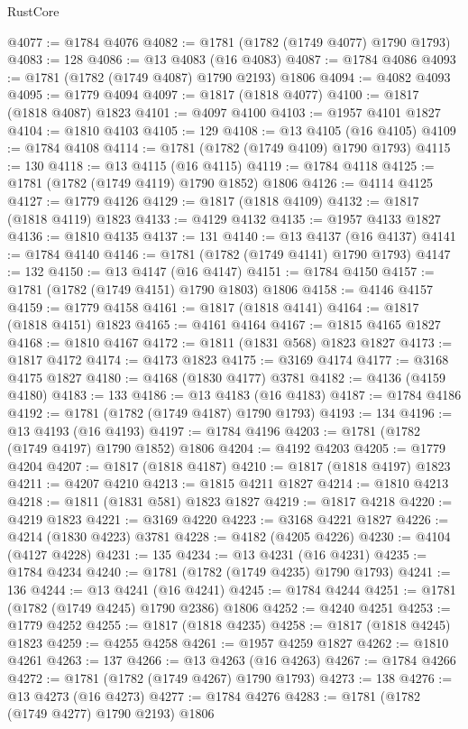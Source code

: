 \begin{lexlean}{RustCore}
\begin{coremodule}
@4077 := @1784 @4076
@4082 := @1781 (@1782 (@1749 @4077) @1790 @1793)
@4083 := 128
@4086 := @13 @4083 (@16 @4083)
@4087 := @1784 @4086
@4093 := @1781 (@1782 (@1749 @4087) @1790 @2193) @1806
@4094 := @4082 @4093
@4095 := @1779 @4094
@4097 := @1817 (@1818 @4077)
@4100 := @1817 (@1818 @4087) @1823
@4101 := @4097 @4100
@4103 := @1957 @4101 @1827
@4104 := @1810 @4103
@4105 := 129
@4108 := @13 @4105 (@16 @4105)
@4109 := @1784 @4108
@4114 := @1781 (@1782 (@1749 @4109) @1790 @1793)
@4115 := 130
@4118 := @13 @4115 (@16 @4115)
@4119 := @1784 @4118
@4125 := @1781 (@1782 (@1749 @4119) @1790 @1852) @1806
@4126 := @4114 @4125
@4127 := @1779 @4126
@4129 := @1817 (@1818 @4109)
@4132 := @1817 (@1818 @4119) @1823
@4133 := @4129 @4132
@4135 := @1957 @4133 @1827
@4136 := @1810 @4135
@4137 := 131
@4140 := @13 @4137 (@16 @4137)
@4141 := @1784 @4140
@4146 := @1781 (@1782 (@1749 @4141) @1790 @1793)
@4147 := 132
@4150 := @13 @4147 (@16 @4147)
@4151 := @1784 @4150
@4157 := @1781 (@1782 (@1749 @4151) @1790 @1803) @1806
@4158 := @4146 @4157
@4159 := @1779 @4158
@4161 := @1817 (@1818 @4141)
@4164 := @1817 (@1818 @4151) @1823
@4165 := @4161 @4164
@4167 := @1815 @4165 @1827
@4168 := @1810 @4167
@4172 := @1811 (@1831 @568) @1823 @1827
@4173 := @1817 @4172
@4174 := @4173 @1823
@4175 := @3169 @4174
@4177 := @3168 @4175 @1827
@4180 := @4168 (@1830 @4177) @3781
@4182 := @4136 (@4159 @4180)
@4183 := 133
@4186 := @13 @4183 (@16 @4183)
@4187 := @1784 @4186
@4192 := @1781 (@1782 (@1749 @4187) @1790 @1793)
@4193 := 134
@4196 := @13 @4193 (@16 @4193)
@4197 := @1784 @4196
@4203 := @1781 (@1782 (@1749 @4197) @1790 @1852) @1806
@4204 := @4192 @4203
@4205 := @1779 @4204
@4207 := @1817 (@1818 @4187)
@4210 := @1817 (@1818 @4197) @1823
@4211 := @4207 @4210
@4213 := @1815 @4211 @1827
@4214 := @1810 @4213
@4218 := @1811 (@1831 @581) @1823 @1827
@4219 := @1817 @4218
@4220 := @4219 @1823
@4221 := @3169 @4220
@4223 := @3168 @4221 @1827
@4226 := @4214 (@1830 @4223) @3781
@4228 := @4182 (@4205 @4226)
@4230 := @4104 (@4127 @4228)
@4231 := 135
@4234 := @13 @4231 (@16 @4231)
@4235 := @1784 @4234
@4240 := @1781 (@1782 (@1749 @4235) @1790 @1793)
@4241 := 136
@4244 := @13 @4241 (@16 @4241)
@4245 := @1784 @4244
@4251 := @1781 (@1782 (@1749 @4245) @1790 @2386) @1806
@4252 := @4240 @4251
@4253 := @1779 @4252
@4255 := @1817 (@1818 @4235)
@4258 := @1817 (@1818 @4245) @1823
@4259 := @4255 @4258
@4261 := @1957 @4259 @1827
@4262 := @1810 @4261
@4263 := 137
@4266 := @13 @4263 (@16 @4263)
@4267 := @1784 @4266
@4272 := @1781 (@1782 (@1749 @4267) @1790 @1793)
@4273 := 138
@4276 := @13 @4273 (@16 @4273)
@4277 := @1784 @4276
@4283 := @1781 (@1782 (@1749 @4277) @1790 @2193) @1806

\end{coremodule}
\end{lexlean}
